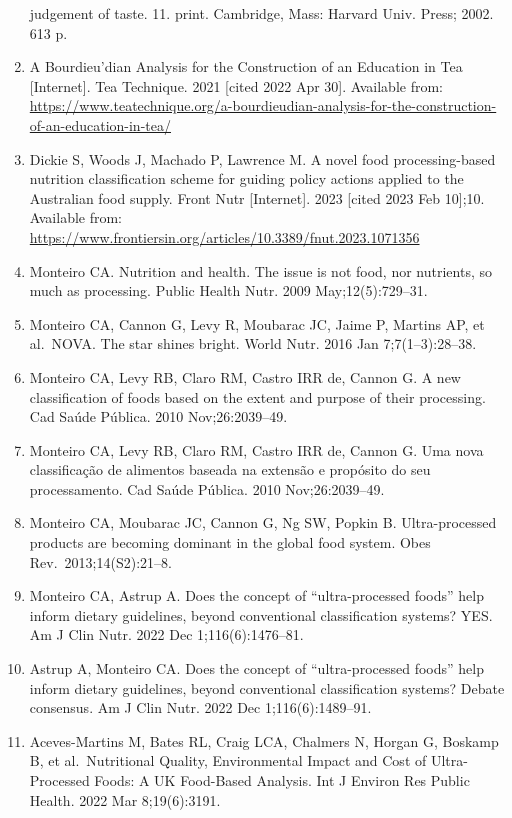 \documentclass[
]{article}
\begin{document}
\begin{enumerate}
  judgement of taste. 11. print. Cambridge, Mass: Harvard Univ. Press;
  2002. 613 p.~
\item
  A Bourdieu'dian Analysis for the Construction of an Education in Tea
  {[}Internet{]}. Tea Technique. 2021 {[}cited 2022 Apr 30{]}. Available
  from:
  \url{https://www.teatechnique.org/a-bourdieudian-analysis-for-the-construction-of-an-education-in-tea/}
\item
  Dickie S, Woods J, Machado P, Lawrence M. A novel food
  processing-based nutrition classification scheme for guiding policy
  actions applied to the Australian food supply. Front Nutr
  {[}Internet{]}. 2023 {[}cited 2023 Feb 10{]};10. Available from:
  \url{https://www.frontiersin.org/articles/10.3389/fnut.2023.1071356}
\item
  Monteiro CA. Nutrition and health. The issue is not food, nor
  nutrients, so much as processing. Public Health Nutr. 2009
  May;12(5):729--31.
\item
  Monteiro CA, Cannon G, Levy R, Moubarac JC, Jaime P, Martins AP, et
  al.~NOVA. The star shines bright. World Nutr. 2016 Jan
  7;7(1--3):28--38.
\item
  Monteiro CA, Levy RB, Claro RM, Castro IRR de, Cannon G. A new
  classification of foods based on the extent and purpose of their
  processing. Cad Saúde Pública. 2010 Nov;26:2039--49.
\item
  Monteiro CA, Levy RB, Claro RM, Castro IRR de, Cannon G. Uma nova
  classificação de alimentos baseada na extensão e propósito do seu
  processamento. Cad Saúde Pública. 2010 Nov;26:2039--49.
\item
  Monteiro CA, Moubarac JC, Cannon G, Ng SW, Popkin B. Ultra-processed
  products are becoming dominant in the global food system. Obes
  Rev.~2013;14(S2):21--8.
\item
  Monteiro CA, Astrup A. Does the concept of ``ultra-processed foods''
  help inform dietary guidelines, beyond conventional classification
  systems? YES. Am J Clin Nutr. 2022 Dec 1;116(6):1476--81.
\item
  Astrup A, Monteiro CA. Does the concept of ``ultra-processed foods''
  help inform dietary guidelines, beyond conventional classification
  systems? Debate consensus. Am J Clin Nutr. 2022 Dec 1;116(6):1489--91.
\item
  Aceves-Martins M, Bates RL, Craig LCA, Chalmers N, Horgan G, Boskamp
  B, et al.~Nutritional Quality, Environmental Impact and Cost of
  Ultra-Processed Foods: A UK Food-Based Analysis. Int J Environ Res
  Public Health. 2022 Mar 8;19(6):3191.

\end{enumerate}
\end{document}
